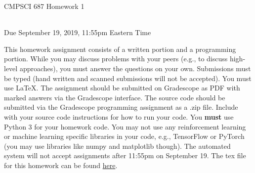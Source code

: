 \documentclass[]{article}
\begin{document}
\newpage
\begin{center}
    \begin{Large}
    CMPSCI 687 Homework 1
    \end{Large}
    \\
    Due September 19, 2019, 11:55pm Eastern Time
\end{center}

 This homework assignment consists of a written portion and a programming portion. While you may discuss problems with your peers (e.g., to discuss high-level approaches), you must answer the questions on your own. Submissions must be typed (hand written and scanned submissions will not be accepted). You must use \LaTeX. The assignment should be submitted on Gradescope as PDF with marked answers via the Gradescope interface. The source code should be submitted via the Gradescope programming assignment as a .zip file. Include with your source code instructions for how to run your code. You \textbf{must} use Python 3 for your homework code. You may not use any reinforcement learning or machine learning specific libraries in your code, e.g., TensorFlow or PyTorch (you may use libraries like numpy and matplotlib though). The automated system will not accept assignments after 11:55pm on September 19. The tex file for this homework can be found \href{https://people.cs.umass.edu/~pthomas/courses/CMPSCI_687_Fall2019/hw1Source.tex}{here}.
\end{document}
